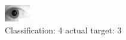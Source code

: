 \begin{figure}[h!]
\begin{center}
\includegraphics[width=0.60\columnwidth]{figures/ID1972_class_4_target_3.png}
\end{center}
\caption{ Classification: 4 actual target: 3}
\label{fig:ID1972_class_4_target_3}
\end{figure}
